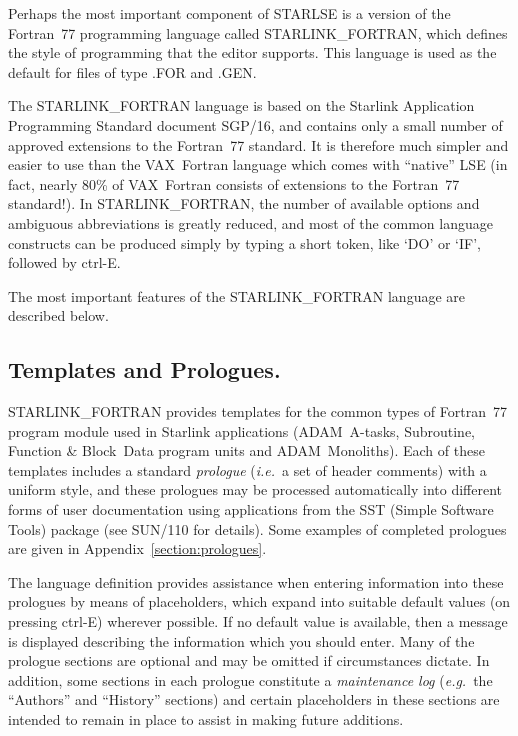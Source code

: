 Perhaps the most important component of \mbox{STARLSE} is a version of the
Fortran~77 programming language called \mbox{STARLINK\_FORTRAN}, which
defines the style of programming that the editor supports.
This language is used as the default for files of type \mbox{.FOR} and
\mbox{.GEN}.

The \mbox{STARLINK\_FORTRAN} language is based on the Starlink Application
Programming Standard document SGP/16, and contains only a small number of
approved extensions to the Fortran~77 standard.
It is therefore much simpler and easier to use than the \mbox{VAX}~Fortran
language which comes with ``native'' \mbox{LSE} (in fact, nearly 80\% of
\mbox{VAX}~Fortran consists of extensions to the Fortran~77 standard!).
In \mbox{STARLINK\_FORTRAN}, the number of available options and ambiguous
abbreviations is greatly reduced, and most of the common language constructs
can be produced simply by typing a short token, like `DO' or `IF', followed
by \mbox{ctrl-E}.

The most important features of the \mbox{STARLINK\_FORTRAN} language are
described below.


\subsection{Templates and Prologues.}

\mbox{STARLINK\_FORTRAN} provides templates for the common types of
Fortran~77 program module used in Starlink applications
(\mbox{ADAM}~\mbox{A-tasks}, \mbox{Subroutine}, \mbox{Function} \&
\mbox{Block}~\mbox{Data} program units and ADAM~Monoliths).
Each of these templates includes a standard {\em prologue} ({\em i.e.}\ a
set of header comments) with a uniform style, and these prologues may be
processed automatically into different forms of user documentation using
applications from the SST (Simple Software Tools) package (see SUN/110 for
details).
Some examples of completed prologues are given in
Appendix~\ref{section:prologues}.

The language definition provides assistance when entering information into
these prologues by means of placeholders, which expand into suitable default
values (on pressing \mbox{ctrl-E}) wherever possible.
If no default value is available, then a message is displayed describing the
information which you should enter.
Many of the prologue sections are optional and may be omitted if
circumstances dictate.
In addition, some sections in each prologue constitute a {\em maintenance
log} ({\em e.g.}\ the ``Authors'' and ``History'' sections) and certain
placeholders in these sections are intended to remain in place to assist in
making future additions.

